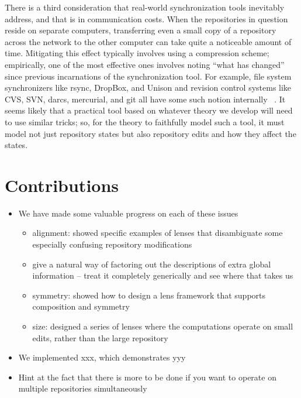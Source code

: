 There is a third consideration that real-world synchronization tools
inevitably address, and that is in communication costs. When the
repositories in question reside on separate computers, transferring even a
small copy of a repository across the network to the other computer can
take quite a noticeable amount of time. Mitigating this effect typically
involves using a compression scheme; empirically, one of the most effective
ones involves noting ``what has changed'' since previous incarnations of the
synchronization tool. For example, file system synchronizers like rsync,
DropBox, and Unison and revision control systems like CVS, SVN, darcs,
mercurial, and git all have some such notion internally~%
\cite{Tridgell96rsync,dropbox,pierce2004unison,berliner1990cvs,subversion,darcs,mercurial,git}.
It seems likely that a practical tool based on whatever theory we develop
will need to use similar tricks; so, for the theory to faithfully model such
a tool, it must model not just repository states but also repository edits
and how they affect the states.

\section{Contributions}
\label{sec:intro-contributions}
\begin{itemize}
    \item We have made some valuable progress on each of these issues
        \begin{itemize}
            \item alignment: showed specific examples of lenses that
                disambiguate some especially confusing repository
                modifications
            \item give a natural way of factoring out the descriptions of
                extra global information -- treat it completely generically
                and see where that takes us
            \item symmetry: showed how to design a lens framework that
                supports composition and symmetry
            \item size: designed a series of lenses where the computations
                operate on small edits, rather than the large repository
        \end{itemize}
    \item We implemented xxx, which demonstrates yyy
    \item Hint at the fact that there is more to be done if you want to
        operate on multiple repositories simultaneously
\end{itemize}
